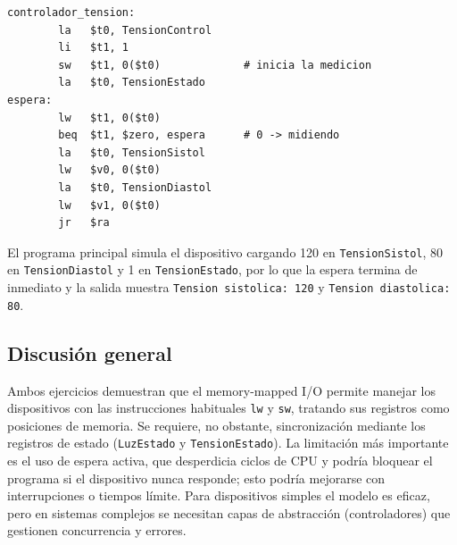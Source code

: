 \documentclass[12pt,a4paper]{article}
\begin{document}
\begin{lstlisting}[style=mips]
controlador_tension:
        la   $t0, TensionControl
        li   $t1, 1
        sw   $t1, 0($t0)             # inicia la medicion
        la   $t0, TensionEstado
espera:
        lw   $t1, 0($t0)
        beq  $t1, $zero, espera      # 0 -> midiendo
        la   $t0, TensionSistol
        lw   $v0, 0($t0)
        la   $t0, TensionDiastol
        lw   $v1, 0($t0)
        jr   $ra
\end{lstlisting}

El programa principal simula el dispositivo cargando 120 en \texttt{TensionSistol}, 80 en \texttt{TensionDiastol} y 1 en \texttt{TensionEstado}, por lo que la espera termina de inmediato y la salida muestra \texttt{Tension sistolica: 120} y \texttt{Tension diastolica: 80}.

\subsection*{Discusión general}

Ambos ejercicios demuestran que el memory-mapped I/O permite manejar los dispositivos con las instrucciones habituales \texttt{lw} y \texttt{sw}, tratando sus registros como posiciones de memoria. Se requiere, no obstante, sincronización mediante los registros de estado (\texttt{LuzEstado} y \texttt{TensionEstado}). La limitación más importante es el uso de espera activa, que desperdicia ciclos de CPU y podría bloquear el programa si el dispositivo nunca responde; esto podría mejorarse con interrupciones o tiempos límite. Para dispositivos simples el modelo es eficaz, pero en sistemas complejos se necesitan capas de abstracción (controladores) que gestionen concurrencia y errores.
\end{document}

